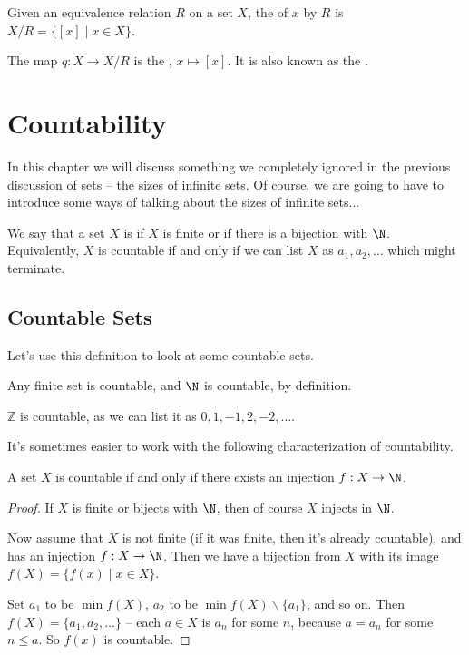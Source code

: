 \documentclass[a4paper]{scrartcl}
\begin{document}
\begin{definition}
	Given an equivalence relation $R$ on a set $X$, the  of $x$ by $R$ is $X/R = \{[x] \mid x \in X\}$.

	The map $q : X \rightarrow X/R$ is the , $x \mapsto [x]$. It is also known as the .
\end{definition}

\section{Countability}

In this chapter we will discuss something we completely ignored in the previous discussion of sets -- the sizes of infinite sets. Of course, we are going to have to introduce some ways of talking about the sizes of infinite sets...

\begin{definition}[Countability]
	We say that a set $X$ is  if $X$ is finite or if there is a bijection with $\N$. Equivalently, $X$ is countable if and only if we can list $X$ as $a_1, a_2, \dots$ which might terminate.
\end{definition}

\subsection{Countable Sets}

Let's use this definition to look at some countable sets.

\begin{example}
	Any finite set is countable, and $\N$ is countable, by definition.
\end{example}

\begin{example}
	$\mathbb{Z}$ is countable, as we can list it as $0, 1, -1, 2, -2, \dots$.
\end{example}

It's sometimes easier to work with the following characterization of countability.

\begin{proposition}
	A set $X$ is countable if and only if there exists an injection $f : X \rightarrow \N$.
\end{proposition}
\begin{proof}
If $X$ is finite or bijects with $\N$, then of course $X$ injects in $\N$.

Now assume that $X$ is not finite (if it was finite, then it's already countable), and has an injection $f : X \rightarrow \N$. Then we have a bijection from $X$ with its image $f(X) = \{f(x) \mid x \in X \}$. 

Set $a_1$ to be $\min f(X)$, $a_2$ to be $\min f(X) \backslash \{a_1\}$, and so on. Then $f(X) = \{a_1, a_2, \dots \}$ -- each $a \in X$ is $a_n$ for some $n$, because $a = a_n$ for some $n \leq a$.
So $f(x)$ is countable.
\end{proof}
\end{document}
